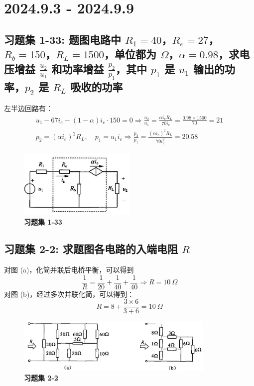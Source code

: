 \documentclass[UTF8]{report}
\theoremstyle{MyLineTheoremStyle} %
\theoremstyle{MyBlockTheoremStyle} %
\theoremstyle{MySubsubsectionStyle} %
\begin{document}
\chapter{2024.9.3 - 2024.9.9}\thispagestyle{fancy}

\section{习题集 1-33: 题图电路中 $R_1 = 40$，$R_e = 27$，$R_b = 150$，$R_L = 1500$，单位都为 $\Omega$，$\alpha = 0.98$，求电压增益 $\frac{u_2}{u_1}$ 和功率增益 $\frac{p_2}{p_1}$，其中 $p_1$ 是 $u_1$ 输出的功率，$p_2$ 是 $R_L$ 吸收的功率}
左半边回路有：
\begin{gather*}
u_1 - 67i_e - (1-\alpha)i_e \cdot 150 = 0 \Longrightarrow \frac{u_2}{u_1} = \frac{\alpha i_eR_L }{70i_e} = \frac{0.98\times 1500}{70} = 21 \\ 
p_2 = (\alpha i_e)^2R_L, \quad p_1 = u_1 i_e \Longrightarrow \frac{p_2}{p_1} = \frac{(\alpha i_e)^2R_L}{70i_e^2} = 20.58
\end{gather*}

\begin{figure}[H]\centering
\includegraphics[width=0.5\textwidth]{assets/2/image (47).jpg}
\caption{\textbf{习题集 1-33}}
\end{figure}


\section{习题集 2-2: 求题图各电路的入端电阻 $R$}
对图 (a)，化简并联后电桥平衡，可以得到
\begin{equation*}
\frac{1}{R} = \frac{1}{20 } + \frac{1}{40} +\frac{1}{40} \Longrightarrow R = 10\ \Omega
\end{equation*}
对图 (b)，经过多次并联化简，可以得到：
\begin{equation}
R = 8 + \frac{3\times 6}{3+6}=10\ \Omega
\end{equation}
\begin{figure}[H]\centering
\includegraphics[width=0.85\textwidth]{assets/2/e02c39d3f229a4b6352b828e57c3737f.jpg}
\caption{\textbf{习题集 2-2}}
\end{figure}
\end{document}
